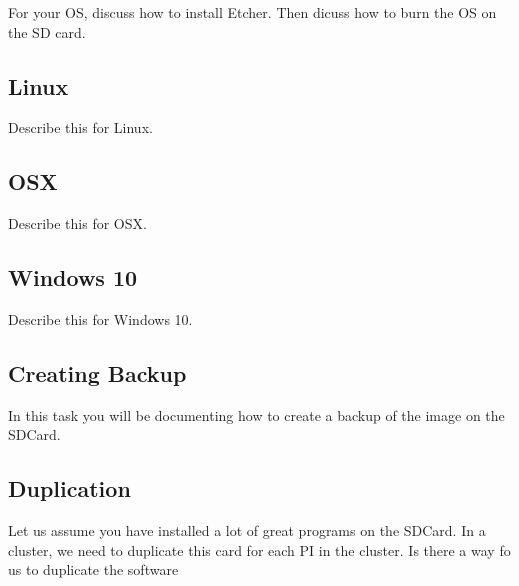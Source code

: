 \begin{exercise}
For your OS, discuss how to install Etcher. Then dicuss how to burn
the OS on the SD card. 
\end{exercise}

\subsection{Linux}


\begin{exercise}
Describe this for Linux.
\end{exercise}

\subsection{OSX}


\begin{exercise}
Describe this for OSX.
\end{exercise}


\subsection{Windows 10}

\begin{exercise}
Describe this for Windows 10.
\end{exercise}


\subsection{Creating Backup}


\begin{exercise}
In this task you will be documenting how to create a backup of the
image on the SDCard.
\end{exercise}

\subsection{Duplication}


\begin{exercise}
Let us assume you have installed a lot of great programs on the
SDCard. In a cluster, we need to duplicate this card for each PI in
the cluster. Is there a way fo us to duplicate the software
\end{exercise}


